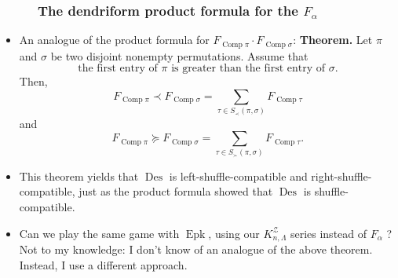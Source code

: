 \documentclass{beamer}
\newcommand{\Comp}{\operatorname{Comp}}
\newcommand{\Epk}{\operatorname{Epk}}
\newcommand{\Des}{\operatorname{Des}}
\newcommand{\fti}[1]{\frametitle{\ \ \ \ \ #1}}
\theoremstyle{plain}
\begin{document}
\begin{frame}
\fti{The dendriform product formula for the $F_\alpha$}

\begin{itemize}

\item An analogue of the product formula for $F_{\Comp\pi} \cdot F_{\Comp\sigma}$:
      \textbf{Theorem.} Let $\pi$ and $\sigma$ be two disjoint nonempty
        permutations. Assume that%
        \[
        \text{the first entry of }\pi\text{ is greater than the first entry of }%
        \sigma\text{.}%
        \]
        Then,%
        \[
        F_{\operatorname*{Comp}\pi}\left.  \prec\right.  F_{\operatorname*{Comp}%
        \sigma}=\sum_{\tau\in S_{\prec}\left(  \pi,\sigma\right)  }%
        F_{\operatorname*{Comp}\tau}%
        \]
        and%
        \[
        F_{\operatorname*{Comp}\pi}\left.  \succeq\right.  F_{\operatorname*{Comp}%
        \sigma}=\sum_{\tau\in S_{\succ}\left(  \pi,\sigma\right)  }%
        F_{\operatorname*{Comp}\tau}.
        \]

\pause

\item This theorem yields that $\Des$ is left-shuffle-compatible
      and right-shuffle-compatible,
      just as the product formula showed that $\Des$ is
      shuffle-compatible.

\pause

\item Can we play the same game with $\Epk$, using our
      $K_{n,\Lambda}^{\mathcal{Z}}$ series instead of $F_\alpha$ ?
      \pause
      \\ Not to my knowledge: I don't know of an analogue
      of the above theorem. Instead, I use a different approach.

\end{itemize}
\vspace{10cm}
\end{frame}
\end{document}
